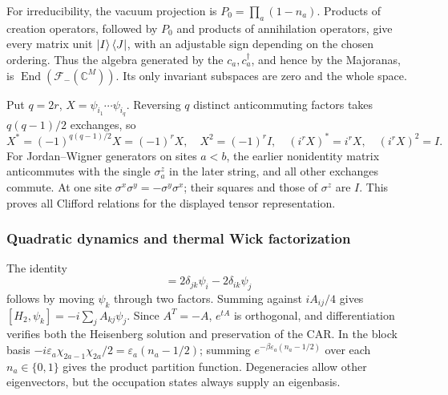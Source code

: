 \documentclass[11pt]{article}
\numberwithin{equation}{section}
\theoremstyle{exposition}
\theoremstyle{result}
\newcommand{\C}{\mathbb C}
\begin{document}
For irreducibility, the vacuum projection is $P_0=\prod_a(1-n_a)$. Products of creation operators, followed by $P_0$ and products of annihilation operators, give every matrix unit $\ket I\bra J$, with an adjustable sign depending on the chosen ordering. Thus the algebra generated by the $c_a,c_a^\dagger$, and hence by the Majoranas, is $\operatorname{End}(\mathcal F_-(\C^M))$. Its only invariant subspaces are zero and the whole space.

Put $q=2r$, $X=\psi_{i_1}\cdots\psi_{i_q}$. Reversing $q$ distinct anticommuting factors takes $q(q-1)/2$ exchanges, so
\begin{equation*}
X^*=(-1)^{q(q-1)/2}X=(-1)^rX,\quad X^2=(-1)^rI,
\quad (i^rX)^*=i^rX,\quad (i^rX)^2=I.
\end{equation*}
For Jordan--Wigner generators on sites $a<b$, the earlier nonidentity matrix anticommutes with the single $\sigma_a^z$ in the later string, and all other exchanges commute. At one site $\sigma^x\sigma^y=-\sigma^y\sigma^x$; their squares and those of $\sigma^z$ are $I$. This proves all Clifford relations for the displayed tensor representation.

\subsubsection{Quadratic dynamics and thermal Wick factorization}
The identity
\begin{equation*}
[\psi_i\psi_j,\psi_k]=2\delta_{jk}\psi_i-2\delta_{ik}\psi_j
\end{equation*}
follows by moving $\psi_k$ through two factors. Summing against $iA_{ij}/4$ gives $[H_2,\psi_k]=-i\sum_jA_{kj}\psi_j$. Since $A^T=-A$, $e^{tA}$ is orthogonal, and differentiation verifies both the Heisenberg solution and preservation of the CAR. In the block basis $-i\varepsilon_a\chi_{2a-1}\chi_{2a}/2=\varepsilon_a(n_a-1/2)$; summing $e^{-\beta\varepsilon_a(n_a-1/2)}$ over each $n_a\in\{0,1\}$ gives the product partition function. Degeneracies allow other eigenvectors, but the occupation states always supply an eigenbasis.
\end{document}
